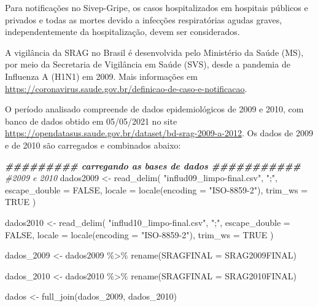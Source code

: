 \documentclass[
]{article}
\newenvironment{Shaded}{\begin{snugshade}}{\end{snugshade}}
\newcommand{\AttributeTok}[1]{\textcolor[rgb]{0.77,0.63,0.00}{#1}}
\newcommand{\CommentTok}[1]{\textcolor[rgb]{0.56,0.35,0.01}{\textit{#1}}}
\newcommand{\ConstantTok}[1]{\textcolor[rgb]{0.00,0.00,0.00}{#1}}
\newcommand{\DocumentationTok}[1]{\textcolor[rgb]{0.56,0.35,0.01}{\textbf{\textit{#1}}}}
\newcommand{\FunctionTok}[1]{\textcolor[rgb]{0.00,0.00,0.00}{#1}}
\newcommand{\NormalTok}[1]{#1}
\newcommand{\OtherTok}[1]{\textcolor[rgb]{0.56,0.35,0.01}{#1}}
\newcommand{\SpecialCharTok}[1]{\textcolor[rgb]{0.00,0.00,0.00}{#1}}
\newcommand{\StringTok}[1]{\textcolor[rgb]{0.31,0.60,0.02}{#1}}
\begin{document}
Para notificações no Sivep-Gripe, os casos hospitalizados em hospitais
públicos e privados e todas as mortes devido a infecções respiratórias
agudas graves, independentemente da hospitalização, devem ser
considerados.

A vigilância da SRAG no Brasil é desenvolvida pelo Ministério da Saúde
(MS), por meio da Secretaria de Vigilância em Saúde (SVS), desde a
pandemia de Influenza A (H1N1) em 2009. Mais informações em
\url{https://coronavirus.saude.gov.br/definicao-de-caso-e-notificacao}.

O período analisado compreende de dados epidemiológicos de 2009 e 2010,
com banco de dados obtido em 05/05/2021 no site
\url{https://opendatasus.saude.gov.br/dataset/bd-srag-2009-a-2012}. Os
dados de 2009 e de 2010 são carregados e combinados abaixo:

\begin{Shaded}
\begin{Highlighting}[]
\DocumentationTok{\#\#\#\#\#\#\#\#\# carregando as bases de dados \#\#\#\#\#\#\#\#\#\#\#}
\CommentTok{\#2009 e 2010}
\NormalTok{dados2009 }\OtherTok{\textless{}{-}} \FunctionTok{read\_delim}\NormalTok{(}
  \StringTok{"influd09\_limpo{-}final.csv"}\NormalTok{,}
  \StringTok{";"}\NormalTok{,}
  \AttributeTok{escape\_double =} \ConstantTok{FALSE}\NormalTok{,}
  \AttributeTok{locale =} \FunctionTok{locale}\NormalTok{(}\AttributeTok{encoding =} \StringTok{"ISO{-}8859{-}2"}\NormalTok{),}
  \AttributeTok{trim\_ws =} \ConstantTok{TRUE}
\NormalTok{)}

\NormalTok{dados2010 }\OtherTok{\textless{}{-}} \FunctionTok{read\_delim}\NormalTok{(}
  \StringTok{"influd10\_limpo{-}final.csv"}\NormalTok{,}
  \StringTok{";"}\NormalTok{,}
  \AttributeTok{escape\_double =} \ConstantTok{FALSE}\NormalTok{,}
  \AttributeTok{locale =} \FunctionTok{locale}\NormalTok{(}\AttributeTok{encoding =} \StringTok{"ISO{-}8859{-}2"}\NormalTok{),}
  \AttributeTok{trim\_ws =} \ConstantTok{TRUE}
\NormalTok{)}

\NormalTok{dados\_2009 }\OtherTok{\textless{}{-}}\NormalTok{ dados2009 }\SpecialCharTok{\%\textgreater{}\%} 
  \FunctionTok{rename}\NormalTok{(}\AttributeTok{SRAGFINAL =}\NormalTok{ SRAG2009FINAL)}

\NormalTok{dados\_2010 }\OtherTok{\textless{}{-}}\NormalTok{ dados2010 }\SpecialCharTok{\%\textgreater{}\%} 
  \FunctionTok{rename}\NormalTok{(}\AttributeTok{SRAGFINAL =}\NormalTok{ SRAG2010FINAL)}

\NormalTok{dados }\OtherTok{\textless{}{-}} \FunctionTok{full\_join}\NormalTok{(dados\_2009, dados\_2010)}


\end{Highlighting}
\end{Shaded}
\end{document}
